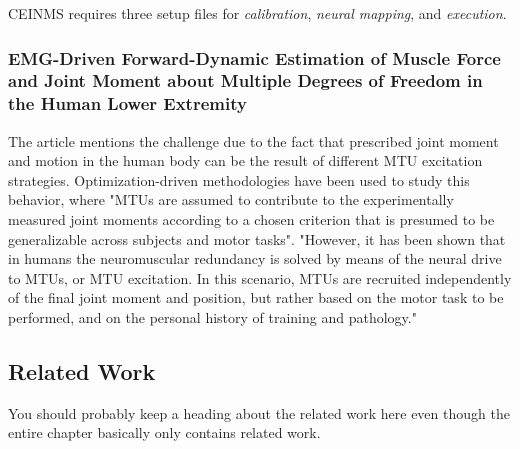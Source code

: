 CEINMS requires three setup files for \textit{calibration}, \textit{neural mapping}, and \textit{execution}.

\subsubsection{EMG-Driven Forward-Dynamic Estimation of Muscle Force and Joint Moment about Multiple Degrees of Freedom in the Human Lower Extremity}

The article mentions the challenge due to the fact that prescribed joint moment and motion in the human body can be the result of different MTU excitation strategies. Optimization-driven methodologies have been used to study this behavior, where "MTUs are assumed to contribute to the experimentally measured joint moments according to a chosen criterion that is presumed to be generalizable across subjects and motor tasks". 
"However, it has been shown that in humans the neuromuscular redundancy is solved by means of the neural drive to MTUs, or MTU excitation. In this scenario, MTUs are recruited independently of the final joint moment and position, but rather based on the motor task to be performed, and on the personal history of training and pathology." \cite{Sartori2012a}

\subsection{Related Work}
You should probably keep a heading about the related work here even though the entire chapter basically only contains related work.
